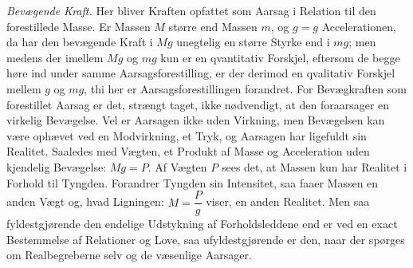 \documentclass[12pt]{book}
\newcommand{\apage}[1]{\marginnote{\footnotesize\textit{[#1]}}}
\begin{document}
\emph{Bevægende Kraft.} Her bliver Kraften opfattet som Aarsag i Relation
til den forestillede Masse. Er Massen $M$ større end Massen $m$, og $g = g$ Accelerationen, da har den bevægende Kraft i $Mg$ unegtelig en større
Styrke end i $mg$; men medens der imellem $Mg$ og $mg$ kun er en
qvantitativ Forskjel, eftersom de begge høre ind under samme
Aarsagsforestilling, er der derimod en qvalitativ Forskjel mellem $g$ og
$mg$, thi her er Aarsagsforestillingen forandret. For Bevægkraften som
forestillet Aarsag er det, strængt taget, ikke nødvendigt, at den
foraarsager en virkelig Bevægelse. Vel er Aarsagen ikke uden Virkning, men
Bevægelsen kan være ophævet ved en Modvirkning, et Tryk, og Aarsagen har
ligefuldt sin Realitet. Saaledes med Vægten, et Produkt af Masse og
\apage{130} Acceleration uden kjendelig Bevægelse: $Mg = P$. Af Vægten $P$ sees det, at
Massen kun har Realitet i Forhold til Tyngden. Forandrer Tyngden sin
Intensitet, saa faaer Massen en anden Vægt og, hvad Ligningen: $M =
\dfrac{P}{g}$ viser, en anden Realitet. Men saa fyldestgjørende den
endelige Udstykning af Forholdsleddene end er ved en exact Bestemmelse af
Relationer og Love, saa ufyldestgjørende er den, naar der spørges om
Realbegreberne selv og de væsenlige Aarsager.
\end{document}
